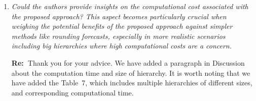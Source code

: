 \documentclass[11pt,a4paper]{article}
\newcommand{\RE}[2][Re:~]{{\color{blue}\textbf{#1}#2}}
\begin{document}
\begin{enumerate}
  \item \textit{Could the authors provide insights on the computational cost associated with the proposed approach? This aspect becomes particularly crucial when weighing the potential benefits of the proposed approach against simpler methods like rounding forecasts, especially in more realistic scenarios including big hierarchies where high computational costs are a concern.}
  
  \RE{Thank you for your advice. We have added a paragraph in Discussion about the computation time and size of hierarchy. It is worth noting that we have added the Table~7, which includes multiple hierarchies of different sizes, and corresponding computational time.}


\end{enumerate}

% 
% 
\printbibliography
\end{document}

